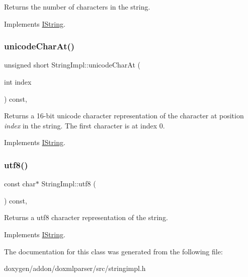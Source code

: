 Returns the number of characters in the string. 

Implements \mbox{\hyperlink{class_i_string_acbd29581b11e69494ce0141e2425071a}{I\+String}}.

\mbox{\label{class_string_impl_a002b2e0e2a91769a583437b6510ed409}} 
\subsubsection{\texorpdfstring{unicodeCharAt()}{unicodeCharAt()}}
{\footnotesize\ttfamily unsigned short String\+Impl\+::unicode\+Char\+At (\begin{DoxyParamCaption}\item[{int}]{index }\end{DoxyParamCaption}) const\hspace{0.3cm}{\ttfamily [inline]}, {\ttfamily [virtual]}}

Returns a 16-\/bit unicode character representation of the character at position {\itshape index} in the string. The first character is at index 0. 

Implements \mbox{\hyperlink{class_i_string_a7a3b84f1621cb087e22b4c8b4246b7d1}{I\+String}}.

\mbox{\label{class_string_impl_a9e7c386a3cd20feb6dea3d98b559535c}} 
\subsubsection{\texorpdfstring{utf8()}{utf8()}}
{\footnotesize\ttfamily const char$\ast$ String\+Impl\+::utf8 (\begin{DoxyParamCaption}{ }\end{DoxyParamCaption}) const\hspace{0.3cm}{\ttfamily [inline]}, {\ttfamily [virtual]}}

Returns a utf8 character representation of the string. 

Implements \mbox{\hyperlink{class_i_string_a552cdb2900b094a432a8608df7bcce8c}{I\+String}}.



The documentation for this class was generated from the following file\+:\begin{DoxyCompactItemize}
\item 
doxygen/addon/doxmlparser/src/stringimpl.\+h\end{DoxyCompactItemize}
